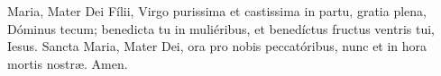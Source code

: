 Maria, Mater Dei Fílii, Virgo purissima et castissima in partu, gratia plena, Dóminus tecum; benedicta tu in muliéribus, 
et benedíctus fructus ventris tui, Iesus. Sancta Maria, Mater Dei, ora pro nobis peccatóribus, nunc et in hora mortis nostr{\ae}. Amen.